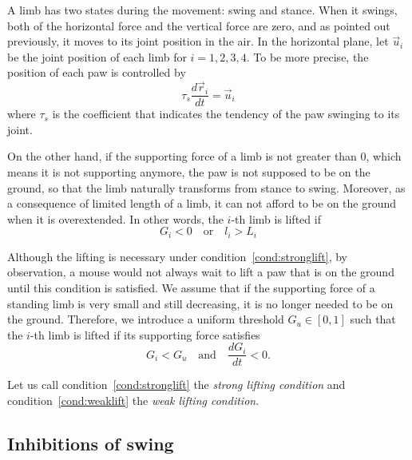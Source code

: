\documentclass[11pt]{article}
\begin{document}
A limb has two states during the movement: swing and stance. When it swings, both of the horizontal force and the vertical force are zero, and as pointed out previously, it moves to its joint position in the air. In the horizontal plane, let $ \vec{u}_i $ be the joint position of each limb for $ i = 1,2,3,4 $. To be more precise, the position of each paw is controlled by
\begin{equation}
	\tau_s  \frac{d \vec{r}_i}{dt} = \vec{u}_i
\end{equation}
where $ \tau_s $ is the coefficient that indicates the tendency of the paw swinging to its joint.


On the other hand, if the supporting force of a limb is not greater than $ 0 $, which means it is not supporting anymore, the paw is not supposed to be on the ground, so that the limb naturally transforms from stance to swing. Moreover, as a consequence of limited length of a limb, it can not afford to be on the ground when it is overextended. In other words, the $ i $-th limb is lifted if 
\begin{equation}\label{cond:stronglift}
	G_i<0 \quad \text{or} \quad l_i> L_i
\end{equation}

Although the lifting is necessary under condition~\ref{cond:stronglift}, by observation, a mouse would not always wait to lift a paw that is on the ground until this condition is satisfied. We assume that if the supporting force of a standing limb is very small and still decreasing, it is no longer needed to be on the ground. Therefore, we introduce a uniform threshold $ G_u\in[0,1] $ such that the $ i $-th limb is lifted if its supporting force satisfies
\begin{equation}\label{cond:weaklift}
	G_i < G_u \quad \text{and}\quad \frac{dG_i}{dt}<0.
\end{equation}

Let us call condition~\ref{cond:stronglift} the \textit{strong lifting condition} and condition~\ref{cond:weaklift} the \textit{weak lifting condition}.

\subsection{Inhibitions of swing}
\end{document}

